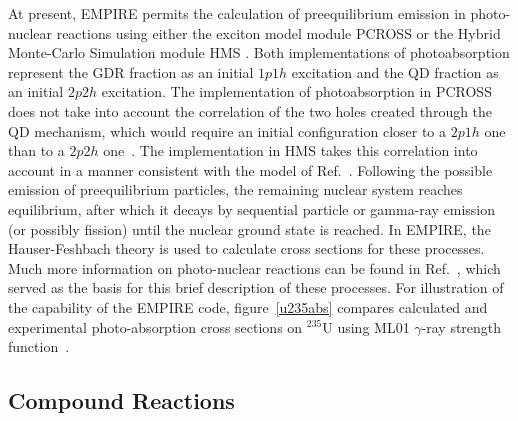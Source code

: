 At present, EMPIRE permits the calculation of preequilibrium emission in
photo-nuclear reactions using either the exciton model module PCROSS%
 or the Hybrid Monte-Carlo Simulation module HMS%
. Both implementations of photoabsorption represent the GDR
fraction as an initial $1p1h$ excitation and the QD fraction as an initial $%
2p2h$ excitation. The implementation of photoabsorption in PCROSS does not
take into account the correlation of the two holes created through the QD
mechanism, which would require an initial configuration closer to a $2p1h$
one than to a $2p2h$ one~\cite{PHNuc}. The implementation in HMS takes this
correlation into account in a manner consistent with the model of Ref.~\cite%
{chadQD}. Following the possible emission of preequilibrium particles, the
remaining nuclear system reaches equilibrium, after which it decays by
sequential particle or gamma-ray emission (or possibly fission) until the
nuclear ground state is reached. In EMPIRE, the Hauser-Feshbach theory is
used to calculate cross sections for these processes. Much more information
on photo-nuclear reactions can be found in Ref.~\cite{PHNuc}, which served
as the basis for this brief description of these processes. For illustration
of the capability of the EMPIRE code, figure~\ref{u235abs} compares
calculated and experimental photo-absorption cross sections on $^{235}$U
using ML01 $\gamma$-ray strength function~\cite{mike2}.


\subsection{Compound Reactions}

